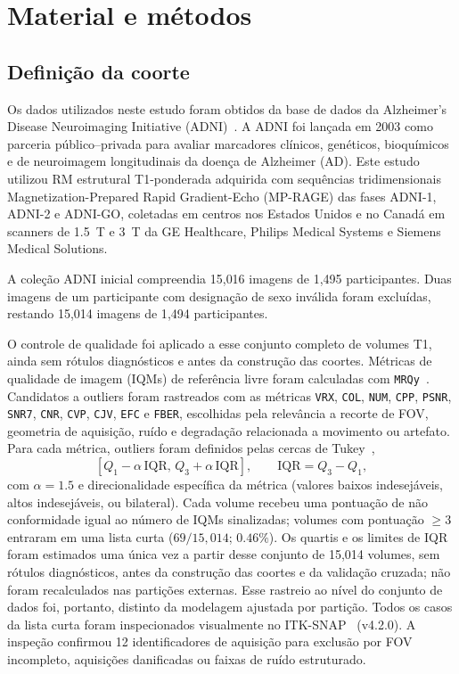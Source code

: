 \documentclass[review]{elsarticle}
\newcommand{\code}[1]{\texttt{#1}}
\begin{document}
	\section{Material e métodos}
	\label{sec:metodos}
	
	\subsection{Definição da coorte}
	\label{sec:populacao}
	
	
	Os dados utilizados neste estudo foram obtidos da base de dados da Alzheimer's Disease Neuroimaging Initiative (ADNI)~\cite{petersen-2009,jr-2008}.
	A ADNI foi lançada em 2003 como parceria público--privada para avaliar marcadores clínicos, genéticos, bioquímicos e de neuroimagem longitudinais da doença de Alzheimer (AD).
	Este estudo utilizou RM estrutural T1-ponderada adquirida com sequências tridimensionais Magnetization-Prepared Rapid Gradient-Echo (MP-RAGE) das fases ADNI-1, ADNI-2 e ADNI-GO, coletadas em centros nos Estados Unidos e no Canadá em scanners de 1.5~T e 3~T da GE Healthcare, Philips Medical Systems e Siemens Medical Solutions.
	
	A coleção ADNI inicial compreendia 15{,}016 imagens de 1{,}495 participantes.
	Duas imagens de um participante com designação de sexo inválida foram excluídas, restando 15{,}014 imagens de 1{,}494 participantes.
	
	O controle de qualidade foi aplicado a esse conjunto completo de volumes T1, ainda sem rótulos diagnósticos e antes da construção das coortes.
	Métricas de qualidade de imagem (IQMs) de referência livre foram calculadas com \code{MRQy}~\citep{sadri-2020}.
	Candidatos a outliers foram rastreados com as métricas \code{VRX}, \code{COL}, \code{NUM}, \code{CPP}, \code{PSNR}, \code{SNR7}, \code{CNR}, \code{CVP}, \code{CJV}, \code{EFC} e \code{FBER}, escolhidas pela relevância a recorte de FOV, geometria de aquisição, ruído e degradação relacionada a movimento ou artefato.
	Para cada métrica, outliers foram definidos pelas cercas de Tukey~\citep{tukey-1977},
	\begin{equation}
		\left[Q_1 - \alpha\,\mathrm{IQR},\, Q_3 + \alpha\,\mathrm{IQR}\right],
		\qquad \mathrm{IQR} = Q_3 - Q_1,
		\label{eq:tukey}
	\end{equation}
	com $\alpha = 1.5$ e direcionalidade específica da métrica (valores baixos indesejáveis, altos indesejáveis, ou bilateral).
	Cada volume recebeu uma pontuação de não conformidade igual ao número de IQMs sinalizadas; volumes com pontuação $\geq 3$ entraram em uma lista curta ($69/15{,}014$; $0.46\%$).
	Os quartis e os limites de IQR foram estimados uma única vez a partir desse conjunto de 15{,}014 volumes, sem rótulos diagnósticos, antes da construção das coortes e da validação cruzada; não foram recalculados nas partições externas.
	Esse rastreio ao nível do conjunto de dados foi, portanto, distinto da modelagem ajustada por partição.
	Todos os casos da lista curta foram inspecionados visualmente no ITK-SNAP~\citep{yushkevich-2006} (v4.2.0).
	A inspeção confirmou 12 identificadores de aquisição para exclusão por FOV incompleto, aquisições danificadas ou faixas de ruído estruturado.
	
\end{document}

